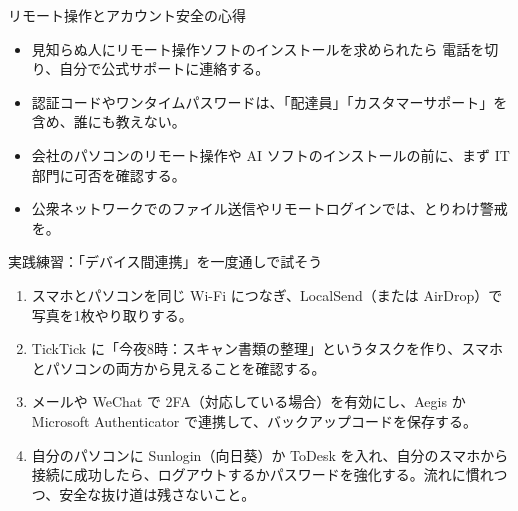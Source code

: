 \begin{tcbwarn}{リモート操作とアカウント安全の心得}
\begin{itemize}
  \item 見知らぬ人にリモート操作ソフトのインストールを求められたら 電話を切り、自分で公式サポートに連絡する。
  \item 認証コードやワンタイムパスワードは、「配達員」「カスタマーサポート」を含め、誰にも教えない。
  \item 会社のパソコンのリモート操作や AI ソフトのインストールの前に、まず IT 部門に可否を確認する。
  \item 公衆ネットワークでのファイル送信やリモートログインでは、とりわけ警戒を。
\end{itemize}

\end{tcbwarn}

\begin{tcbpractice}{実践練習：「デバイス間連携」を一度通しで試そう}
\begin{enumerate}
  \item スマホとパソコンを同じ Wi-Fi につなぎ、LocalSend（または AirDrop）で写真を1枚やり取りする。
  \item TickTick に「今夜8時：スキャン書類の整理」というタスクを作り、スマホとパソコンの両方から見えることを確認する。
  \item メールや WeChat で 2FA（対応している場合）を有効にし、Aegis か Microsoft Authenticator で連携して、バックアップコードを保存する。
  \item 自分のパソコンに Sunlogin（向日葵）か ToDesk を入れ、自分のスマホから接続に成功したら、ログアウトするかパスワードを強化する。流れに慣れつつ、安全な抜け道は残さないこと。
\end{enumerate}

\end{tcbpractice}
